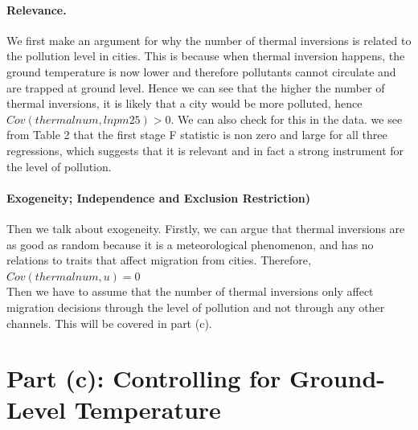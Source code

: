 \documentclass[11pt]{article}
\begin{document}
\paragraph{Relevance.} We first make an argument for why the number of thermal inversions is related to the pollution level in cities. This is because when thermal inversion happens, the ground temperature is now lower and therefore pollutants cannot circulate and are trapped at ground level. Hence we can see that the higher the number of thermal inversions, it is likely that a city would be more polluted, hence $Cov(thermalnum, lnpm25)>0 $. We can also check for this in the data. we see from Table 2 that the first stage F statistic is non zero and large for all three regressions, which suggests that it is relevant and in fact a strong instrument for the level of pollution. 

\paragraph{Exogeneity; Independence and Exclusion Restriction)} Then we talk about exogeneity. Firstly, we can argue that thermal inversions are as good as random because it is a meteorological phenomenon, and has no relations to traits that affect migration from cities. Therefore, $Cov(thermalnum, u) = 0$ \\

\noindent Then we have to assume that the number of thermal inversions only affect migration decisions through the level of pollution and not through any other channels. This will be covered in part (c). \\

\section*{Part (c): Controlling for Ground-Level Temperature}
\end{document}
